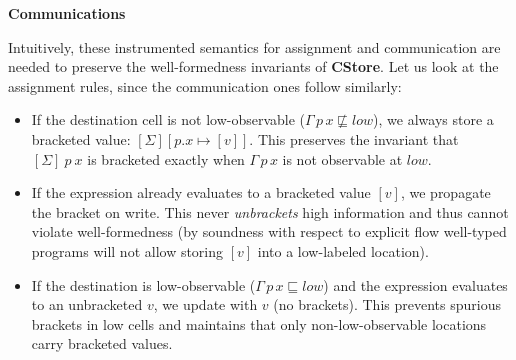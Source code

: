 \documentclass[12pt,a4paper,twoside]{book}
\begin{document}
\noindent\textbf{Communications}
\begin{mathpar}


\end{mathpar}

Intuitively, these instrumented semantics for assignment and communication are needed to preserve the well-formedness invariants of \textbf{CStore}.
Let us look at the assignment rules, since the communication ones follow similarly:
\begin{itemize}
\item If the destination cell is not low-observable (\(\Gamma\,p\,x \not\sqsubseteq low\)), we always store a bracketed value: \([\Sigma][p.x \mapsto [v]]\). This preserves the invariant that \([\Sigma]~p~x\) is bracketed exactly when \(\Gamma\,p\,x\) is not observable at \(low\).
\item If the expression already evaluates to a bracketed value \([v]\), we propagate the bracket on write. This never \emph{unbrackets} high information and thus cannot violate well-formedness (by soundness with respect to explicit flow well-typed programs will not allow storing \([v]\) into a low-labeled location).
\item If the destination is low-observable (\(\Gamma\,p\,x \sqsubseteq low\)) and the expression evaluates to an unbracketed \(v\), we update with \(v\) (no brackets). This prevents spurious brackets in low cells and maintains that only non-low-observable locations carry bracketed values.
\end{itemize}
\end{document}
